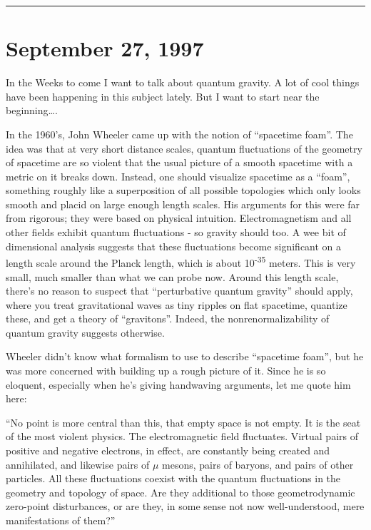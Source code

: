 \documentclass{article}
\begin{document}
\begin{center}\rule{0.5\linewidth}{0.5pt}\end{center}
\hypertarget{week109}{%
\section{September 27, 1997}\label{week109}}

In the Weeks to come I want to talk about quantum gravity. A lot of cool
things have been happening in this subject lately. But I want to start
near the beginning\ldots.

In the 1960's, John Wheeler came up with the notion of ``spacetime
foam''. The idea was that at very short distance scales, quantum
fluctuations of the geometry of spacetime are so violent that the usual
picture of a smooth spacetime with a metric on it breaks down. Instead,
one should visualize spacetime as a ``foam'', something roughly like a
superposition of all possible topologies which only looks smooth and
placid on large enough length scales. His arguments for this were far
from rigorous; they were based on physical intuition. Electromagnetism
and all other fields exhibit quantum fluctuations - so gravity should
too. A wee bit of dimensional analysis suggests that these fluctuations
become significant on a length scale around the Planck length, which is
about 10\textsuperscript{-35} meters. This is very small, much smaller
than what we can probe now. Around this length scale, there's no reason
to suspect that ``perturbative quantum gravity'' should apply, where you
treat gravitational waves as tiny ripples on flat spacetime, quantize
these, and get a theory of ``gravitons''. Indeed, the
nonrenormalizability of quantum gravity suggests otherwise.

Wheeler didn't know what formalism to use to describe ``spacetime
foam'', but he was more concerned with building up a rough picture of
it. Since he is so eloquent, especially when he's giving handwaving
arguments, let me quote him here:

``No point is more central than this, that empty space is not empty. It
is the seat of the most violent physics. The electromagnetic field
fluctuates. Virtual pairs of positive and negative electrons, in effect,
are constantly being created and annihilated, and likewise pairs of
\(\mu\) mesons, pairs of baryons, and pairs of other particles. All
these fluctuations coexist with the quantum fluctuations in the geometry
and topology of space. Are they additional to those geometrodynamic
zero-point disturbances, or are they, in some sense not now
well-understood, mere manifestations of them?''
\end{document}
